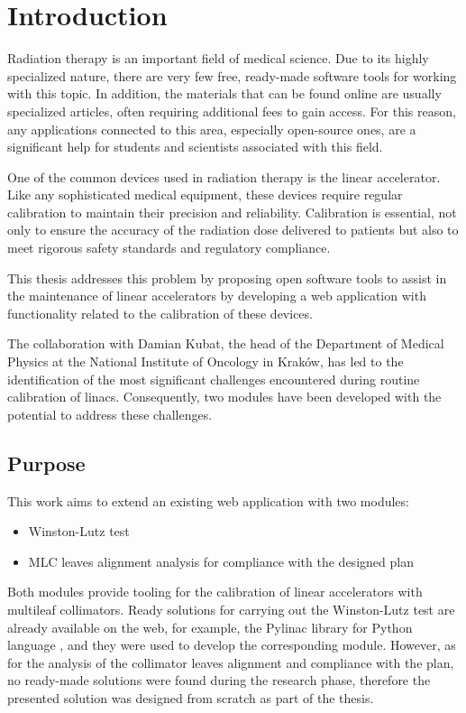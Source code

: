 \chapter{Introduction} \label{chr:intro}

Radiation therapy is an important field of medical science. Due to its highly specialized nature, there are very few free, ready-made software tools for working with this topic. In addition, the materials that can be found online are usually specialized articles, often requiring additional fees to gain access. For this reason, any applications connected to this area, especially open-source ones, are a significant help for students and scientists associated with this field.

One of the common devices used in radiation therapy is the linear accelerator. Like any sophisticated medical equipment, these devices require regular calibration to maintain their precision and reliability. Calibration is essential, not only to ensure the accuracy of the radiation dose delivered to patients but also to meet rigorous safety standards and regulatory compliance.

This thesis addresses this problem by proposing open software tools to assist in the maintenance of linear accelerators by developing a web application with functionality related to the calibration of these devices. 

The collaboration with Damian Kubat, the head of the Department of Medical Physics at the National Institute of Oncology in Kraków, has led to the identification of the most significant challenges encountered during routine calibration of linacs. Consequently, two modules have been developed with the potential to address these challenges.

\section{Purpose}

This work aims to extend an existing web application with two modules:

\begin{itemize}
    \item Winston-Lutz test
    \item MLC leaves alignment analysis for compliance with the designed plan
\end{itemize}

Both modules provide tooling for the calibration of linear accelerators with multileaf collimators. Ready solutions for carrying out the Winston-Lutz test are already available on the web, for example, the Pylinac library for Python language \cite{pylinac}, and they were used to develop the corresponding module. However, as for the analysis of the collimator leaves alignment and compliance with the plan, no ready-made solutions were found during the research phase, therefore the presented solution was designed from scratch as part of the thesis.

